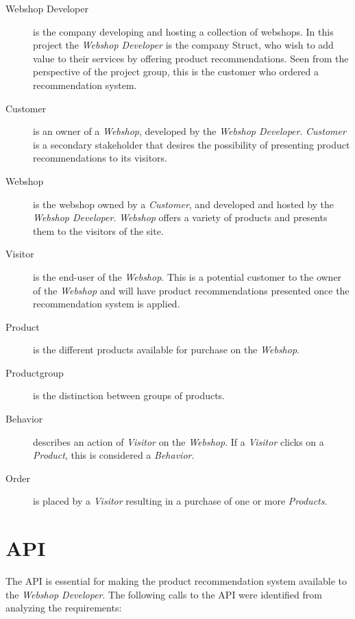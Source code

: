 \begin{description}
	\item[Webshop Developer] is the company developing and hosting a collection of webshops. In this project the \textit{Webshop Developer} is the company \gls{Struct}, who wish to add value to their services by offering product recommendations. Seen from the perspective of the project group, this is the customer who ordered a recommendation system.
	\item[Customer] is an owner of a \textit{Webshop}, developed by the \textit{Webshop Developer}. \textit{Customer} is a secondary stakeholder that desires the possibility of presenting product recommendations to its visitors.
	\item[Webshop] is the webshop owned by a \textit{Customer}, and developed and hosted by the \textit{Webshop Developer}. \textit{Webshop} offers a variety of products and presents them to the visitors of the site.
	\item[Visitor] is the end-user of the \textit{Webshop}. This is a potential customer to the owner of the \textit{Webshop} and will have product recommendations presented once the recommendation system is applied.
	\item[Product] is the different products available for purchase on the \textit{Webshop}. 
	\item[Productgroup] is the distinction between groups of products.
	\item[Behavior] describes an action of \textit{Visitor} on the \textit{Webshop}. If a \textit{Visitor} clicks on a \textit{Product}, this is considered a \textit{Behavior}. 
	\item[Order] is placed by a \textit{Visitor} resulting in a purchase of one or more \textit{Products}.
\end{description}

\section{API}
The API is essential for making the product recommendation system available to the \textit{Webshop Developer}. The following calls to the API were identified from analyzing the requirements:

